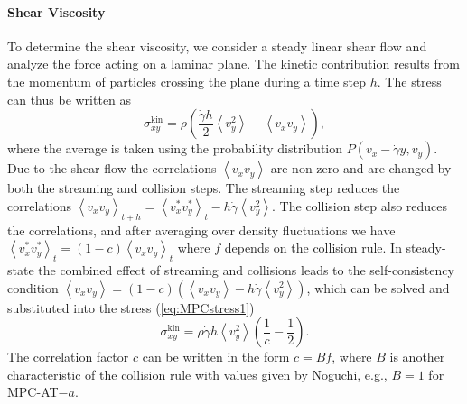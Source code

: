 \documentclass[8.5pt,twoside,twocolumn]{article}
\begin{document}
\paragraph{Shear Viscosity}

To determine the shear viscosity, we consider a steady linear shear flow and analyze the force acting on a laminar plane. 
%
The kinetic contribution results from the momentum of particles crossing the plane during a time step $h$. The stress can thus be written as\cite{Kikuchi:2003,Noguchi:2008}
%
\begin{equation}\label{eq:MPCstress1}
\sigma^\text{kin}_{xy} = \rho \left( \frac{\dot{\gamma} h}{2} \left\langle v_y^2 \right\rangle - \left\langle v_x v_y \right\rangle \right) ,
\end{equation}
%
where the average is taken using the probability distribution $P(v_x-\dot{\gamma}y,v_y)$. Due to the shear flow the correlations $\left\langle v_xv_y \right\rangle$ are non-zero and are changed by both the streaming and collision steps.
%
The streaming step reduces the correlations $\left\langle v_xv_y \right\rangle_{t+h} = \left\langle v_x^*v_y^* \right\rangle_t - h \dot{\gamma} \left\langle v_y^2 \right\rangle$.
%
The collision step also reduces the correlations, and after averaging over density fluctuations we have $\left\langle v_x^*v_y^* \right\rangle_t = (1-c) \left\langle v_xv_y \right\rangle_t$ where $f$ depends on the collision rule. In steady-state the combined effect of streaming and collisions leads to the self-consistency condition $\left\langle v_xv_y \right\rangle = (1-c) \left( \left\langle v_xv_y \right\rangle - h \dot{\gamma} \left\langle v_y^2 \right\rangle \right)$, which can be solved and substituted into the stress (\ref{eq:MPCstress1})
%
\begin{equation}
\sigma^\text{kin}_{xy} = \rho \dot{\gamma} h \left\langle v_y^2 \right\rangle \left( \frac{1}{c} -\frac{1}{2} \right) .
\end{equation}
%
The correlation factor $c$ can be written in the form $c=Bf$, where $B$ is another characteristic of the collision rule with values given by Noguchi\cite{Noguchi:2008}, e.g., $B=1$ for MPC-AT$-a$.
\end{document}
